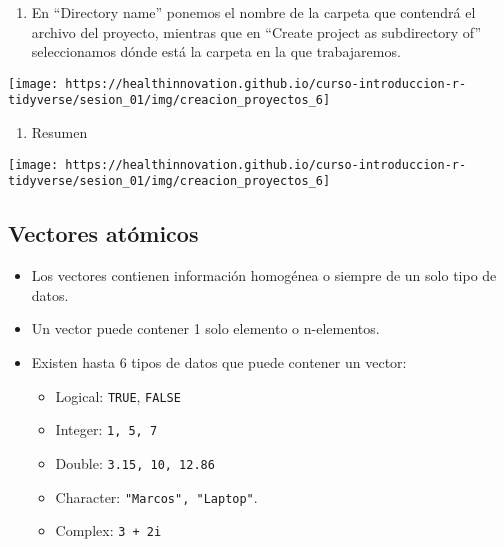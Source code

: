 \documentclass[
]{book}
\providecommand{\tightlist}{%
  \setlength{\itemsep}{0pt}\setlength{\parskip}{0pt}}
\begin{document}
\begin{enumerate}
\def\labelenumi{\arabic{enumi}.}
\setcounter{enumi}{3}
\tightlist
\item
  En ``Directory name'' ponemos el nombre de la carpeta que contendrá el archivo del proyecto, mientras que en ``Create project as subdirectory of'' seleccionamos dónde está la carpeta en la que trabajaremos.
\end{enumerate}

\begin{center}\texttt{[image: https://healthinnovation.github.io/curso-introduccion-r-tidyverse/sesion\_01/img/creacion\_proyectos\_6]} \end{center}

\begin{enumerate}
\def\labelenumi{\arabic{enumi}.}
\setcounter{enumi}{4}
\tightlist
\item
  Resumen
\end{enumerate}

\begin{center}\texttt{[image: https://healthinnovation.github.io/curso-introduccion-r-tidyverse/sesion\_01/img/creacion\_proyectos\_6]} \end{center}

\hypertarget{vectores-atuxf3micos}{%
\subsection{Vectores atómicos}\label{vectores-atuxf3micos}}

\begin{itemize}
\item
  Los vectores contienen información homogénea o siempre de un solo tipo de datos.
\item
  Un vector puede contener 1 solo elemento o n-elementos.
\item
  Existen hasta 6 tipos de datos que puede contener un vector:

  \begin{itemize}
  \tightlist
  \item
    Logical: \texttt{TRUE}, \texttt{FALSE}
  \item
    Integer: \texttt{1,\ 5,\ 7}
  \item
    Double: \texttt{3.15,\ 10,\ 12.86}
  \item
    Character: \texttt{"Marcos",\ "Laptop"}.
  \item
    Complex: \texttt{3\ +\ 2i}
  \end{itemize}
\end{itemize}
\end{document}
